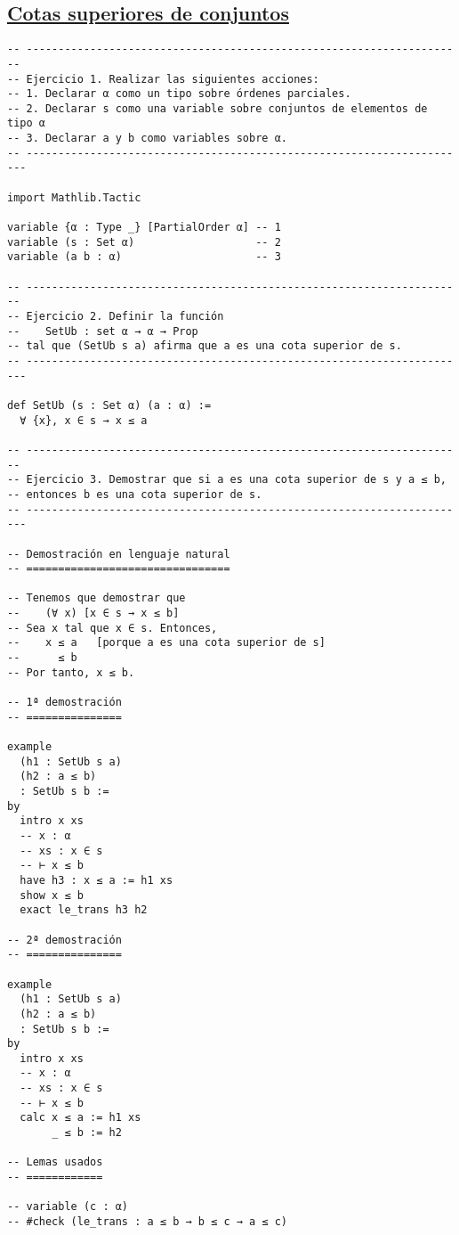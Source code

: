 \subsection{\href{./src/Logica/Cotas\_superiores\_de\_conjuntos.lean}{Cotas superiores de conjuntos}}
\label{sec:orgf29f286}
\begin{verbatim}
-- ---------------------------------------------------------------------
-- Ejercicio 1. Realizar las siguientes acciones:
-- 1. Declarar α como un tipo sobre órdenes parciales.
-- 2. Declarar s como una variable sobre conjuntos de elementos de tipo α
-- 3. Declarar a y b como variables sobre α.
-- ----------------------------------------------------------------------

import Mathlib.Tactic

variable {α : Type _} [PartialOrder α] -- 1
variable (s : Set α)                   -- 2
variable (a b : α)                     -- 3

-- ---------------------------------------------------------------------
-- Ejercicio 2. Definir la función
--    SetUb : set α → α → Prop
-- tal que (SetUb s a) afirma que a es una cota superior de s.
-- ----------------------------------------------------------------------

def SetUb (s : Set α) (a : α) :=
  ∀ {x}, x ∈ s → x ≤ a

-- ---------------------------------------------------------------------
-- Ejercicio 3. Demostrar que si a es una cota superior de s y a ≤ b,
-- entonces b es una cota superior de s.
-- ----------------------------------------------------------------------

-- Demostración en lenguaje natural
-- ================================

-- Tenemos que demostrar que
--    (∀ x) [x ∈ s → x ≤ b]
-- Sea x tal que x ∈ s. Entonces,
--    x ≤ a   [porque a es una cota superior de s]
--      ≤ b
-- Por tanto, x ≤ b.

-- 1ª demostración
-- ===============

example
  (h1 : SetUb s a)
  (h2 : a ≤ b)
  : SetUb s b :=
by
  intro x xs
  -- x : α
  -- xs : x ∈ s
  -- ⊢ x ≤ b
  have h3 : x ≤ a := h1 xs
  show x ≤ b
  exact le_trans h3 h2

-- 2ª demostración
-- ===============

example
  (h1 : SetUb s a)
  (h2 : a ≤ b)
  : SetUb s b :=
by
  intro x xs
  -- x : α
  -- xs : x ∈ s
  -- ⊢ x ≤ b
  calc x ≤ a := h1 xs
       _ ≤ b := h2

-- Lemas usados
-- ============

-- variable (c : α)
-- #check (le_trans : a ≤ b → b ≤ c → a ≤ c)
\end{verbatim}

